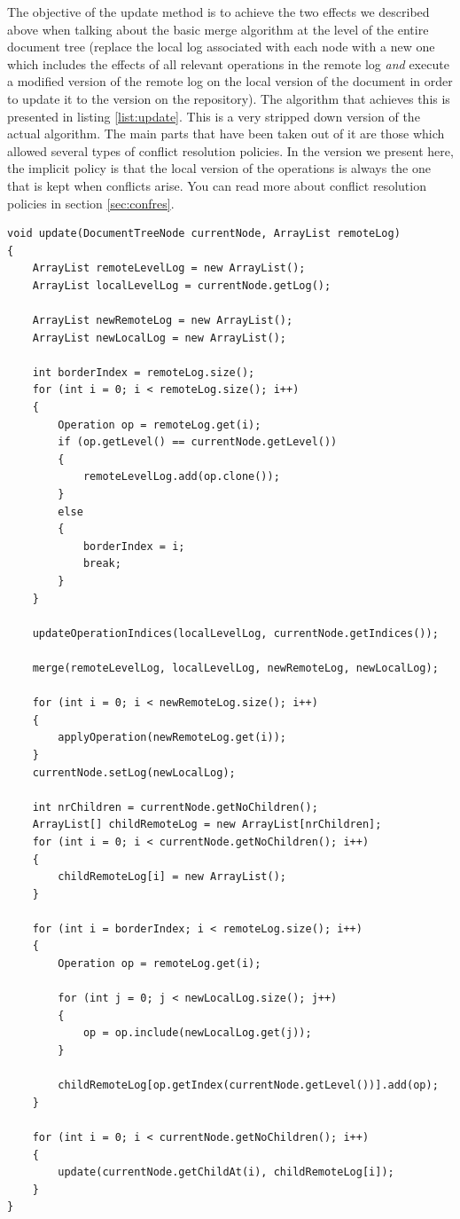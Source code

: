 The objective of the update method is to achieve the two effects we described above when talking about the
basic merge algorithm at the level of the entire document tree (replace the local log associated with each
node with a new one which includes the effects of all relevant operations in the remote log \emph{and} execute
a modified version of the remote log on the local version of the document in order to update it to the
version on the repository). The algorithm that achieves this is presented in listing \ref{list:update}.
This is a very stripped down version of the actual algorithm. The main parts that have been taken out of
it are those which allowed several types of conflict resolution policies. In the version we present here,
the implicit policy is that the local version of the operations is always the one that is kept when
conflicts arise. You can read more about conflict resolution policies in section \ref{sec:confres}.

\begin{lstlisting}[frame=lines,float=p,caption=the update procedure,label=list:update]
void update(DocumentTreeNode currentNode, ArrayList remoteLog)
{
	ArrayList remoteLevelLog = new ArrayList();
	ArrayList localLevelLog = currentNode.getLog();

	ArrayList newRemoteLog = new ArrayList();
	ArrayList newLocalLog = new ArrayList();

	int borderIndex = remoteLog.size();
	for (int i = 0; i < remoteLog.size(); i++)
	{
		Operation op = remoteLog.get(i);
		if (op.getLevel() == currentNode.getLevel())
		{
			remoteLevelLog.add(op.clone());
		}
		else
		{
			borderIndex = i;
			break;
		}
	}

	updateOperationIndices(localLevelLog, currentNode.getIndices());

	merge(remoteLevelLog, localLevelLog, newRemoteLog, newLocalLog);

	for (int i = 0; i < newRemoteLog.size(); i++)
	{
		applyOperation(newRemoteLog.get(i));
	}
	currentNode.setLog(newLocalLog);

	int nrChildren = currentNode.getNoChildren();
	ArrayList[] childRemoteLog = new ArrayList[nrChildren];
	for (int i = 0; i < currentNode.getNoChildren(); i++)
	{
		childRemoteLog[i] = new ArrayList();
	}

	for (int i = borderIndex; i < remoteLog.size(); i++)
	{
		Operation op = remoteLog.get(i);

		for (int j = 0; j < newLocalLog.size(); j++)
		{
			op = op.include(newLocalLog.get(j));
		}

		childRemoteLog[op.getIndex(currentNode.getLevel())].add(op);
	}

	for (int i = 0; i < currentNode.getNoChildren(); i++)
	{
		update(currentNode.getChildAt(i), childRemoteLog[i]);
	}
}
\end{lstlisting}

